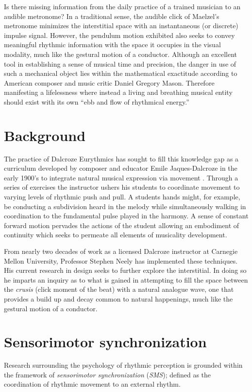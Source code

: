 Is there missing information from the daily practice of a trained musician to an audible metronome? In a traditional sense, the audible click of Maelzel's metronome minimizes the interstitial space with an instantaneous (or discrete) impulse signal. However, the pendulum motion exhibited also seeks to convey meaningful rhythmic information with the space it occupies in the visual modality, much like the gestural motion of a conductor. Although an excellent tool in establishing a sense of musical time and precision, the danger in use of such a mechanical object lies within the mathematical exactitude according to American composer and music critic Daniel Gregory Mason. Therefore manifesting a lifelessness where instead a living and breathing musical entity should exist with its own ``ebb and flow of rhythmical energy.''\cite{fitts2008new}

\section{Background}
The practice of Dalcroze Eurythmics has sought to fill this knowledge gap as a curriculum developed by composer and educator Emile Jaques-Dalcroze in the early 1900's to integrate natural musical expression via movement \cite{jaques1930eurhythmics}. Through a series of exercises the instructor ushers his students to coordinate movement to varying levels of rhythmic push and pull. A students hands might, for example, be conducting a subdivision heard in the melody while simultaneously walking in coordination to the fundamental pulse played in the harmony. A sense of constant forward motion pervades the actions of the student allowing an embodiment of continuity which seeks to permeate all elements of musicality development.

From nearly two decades of work as a licensed Dalcroze instructor at Carnegie Mellon University, Professor Stephen Neely has implemented these techniques. His current research in design seeks to further explore the interstitial. In doing so he imparts an inquiry as to what is gained in attempting to fill the space between the \textit{crusis} (click moment of the beat) with a natural analogue wave, one that provides a build up and decay common to natural happenings, much like the gestural motion of a conductor.

\section{Sensorimotor synchronization}
Research surrounding the psychology of rhythmic perception is grounded within the framework of \textit{sensorimotor synchronization} (\textit{SMS}); defined as the coordination of rhythmic movement to an external rhythm. 

